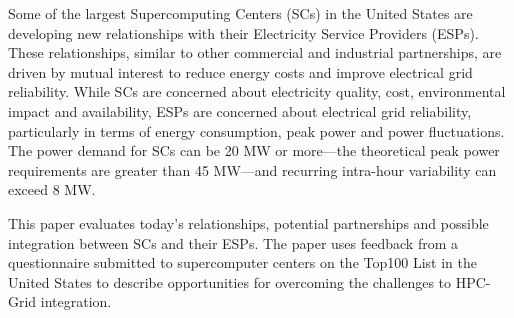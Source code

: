 Some of the largest Supercomputing Centers (SCs) in the United States are developing new relationships with their Electricity Service Providers (ESPs). These relationships, similar to other commercial and industrial partnerships, are driven by mutual interest to reduce energy costs and improve electrical grid reliability. While SCs are concerned about electricity quality, cost, environmental impact and availability, ESPs are concerned about electrical grid reliability, particularly in terms of energy consumption, peak power and power fluctuations. The power demand for SCs can be 20 MW or more---the theoretical peak power requirements are greater than 45 MW---and recurring intra-hour variability can exceed 8 MW.

This paper evaluates today's relationships, potential partnerships and possible integration between SCs and their ESPs. The paper uses feedback from a questionnaire submitted to supercomputer centers on the Top100 List in the United States to describe opportunities for overcoming the challenges to HPC-Grid integration.


%
%
%
%
%
%
